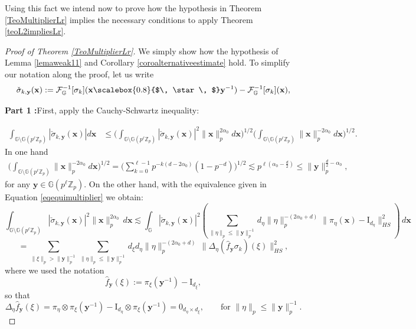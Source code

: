 \documentclass[12pt, reqno]{amsart}
\newcommand{\Z}{\mathbb{Z}}
\newcommand{\1}{\mathds{1}}
\newcommand{\G}{\mathbb{G}}
\newcommand{\smallstar}{\scalebox{0.8}{$\, \star \, $}}
\begin{document}
Using this fact we intend now to prove how the hypothesis in Theorem \ref{TeoMultiplierLr} implies the necessary conditions to apply Theorem \ref{teoL2impliesLr}.
\begin{proof}[Proof of Theorem \ref{TeoMultiplierLr}]
We simply show how the hypothesis of Lemma \ref{lemaweak11} and Corollary \ref{coroalternativeestimate} hold. To simplify our notation along the proof, let us write
\[
\check{\sigma}_{k,\mathbf{y}}(\mathbf{x})
:=
\mathcal{F}^{-1}_{\G}[\sigma_k](\mathbf{x}\smallstar \mathbf{y}^{-1})
-
\mathcal{F}^{-1}_{\G}[\sigma_k](\mathbf{x}),
\] 

\textbf{Part 1 :}First, apply the Cauchy-Schwartz inequality:

\begin{align*}
    \int_{\G \setminus \G (p^\ell \Z_p)}|\check{\sigma}_{k,\mathbf{y}}(\mathbf{x})| d \mathbf{x} & \leq \Big(\int_{\G \setminus \G (p^\ell \Z_p)}|\check{\sigma}_{k,\mathbf{y}}(\mathbf{x})|^2 \| \mathbf{x}\|_p^{2 \alpha_0} d \mathbf{x} \Big)^{1/2} \Big( \int_{\G \setminus \G (p^\ell \Z_p)}\| \mathbf{x} \|_p^{-2 \alpha_0} d \mathbf{x} \Big)^{1/2}.
\end{align*}In one hand 
\begin{align*}
    \Big( \int_{\G \setminus \G (p^\ell \Z_p)}\| \mathbf{x} \|_p^{-2 \alpha_0} d \mathbf{x} \Big)^{1/2} = \Big( \sum_{k=0}^{ \ell -1} p^{-k(d- 2\alpha_0)}(1-p^{-d}) \Big)^{1/2} \lesssim p^{\ell(\alpha_0 - \frac{d}{2})} \leq \| \mathbf{y} \|_p^{ \frac{d}{2} - \alpha_0},
\end{align*}for any $\mathbf{y} \in \G (p^\ell \Z_p)$.  On the other hand, with the equivalence given in Equation \ref{eqequimultiplier} we obtain: 
\[
\int_{\G \setminus \G(p^\ell \mathbb{Z}_p)}
|\check{\sigma}_{k,\mathbf{y}}(\mathbf{x})|^2
\|\mathbf{x}\|_p^{2 \alpha_0 }
\,d\mathbf{x}
\lesssim
\int_{\G}
|\check{\sigma}_{k,\mathbf{y}}(\mathbf{x})|^2
\left(
\sum_{\|\eta\|_p \le \|\mathbf{y}\|_p^{-1}}
d_\eta 
\|\eta\|_p^{-(2 \alpha_0 +d)}
\|\pi_\eta(\mathbf{x})-\mathrm{I}_{d_\eta} \|_{HS}^2
\right)
\,d\mathbf{x}
\]
\[
=
\sum_{\|\xi\|_p > \|\mathbf{y}\|_p^{-1}}
\sum_{\|\eta\|_p \le \|\mathbf{y}\|_p^{-1}}
d_\xi d_\eta 
\|\eta\|_p^{-(2 \alpha_0 +d)}
\,
\|\Delta_\eta(\widehat{f}_{\mathbf{y}}\sigma_k)(\xi)\|_{HS}^2,
\]
where we used the notation
\[
\widehat{f}_{\mathbf{y}}(\xi)
:=
\pi_\xi(\mathbf{y}^{-1})-\mathrm{I}_{d_\xi},
\]
so that
\[
\Delta_\eta \widehat{f}_{\mathbf{y}}(\xi)
=
\pi_\eta\otimes\pi_\xi(\mathbf{y}^{-1})
-
\mathrm{I}_{d_\eta} \otimes\pi_\xi(\mathbf{y}^{-1})
=
0_{d_\eta\times d_\xi},
\qquad
\text{for } \|\eta\|_p \le \|\mathbf{y}\|_p^{-1}.
\]


\end{proof}
\end{document}
